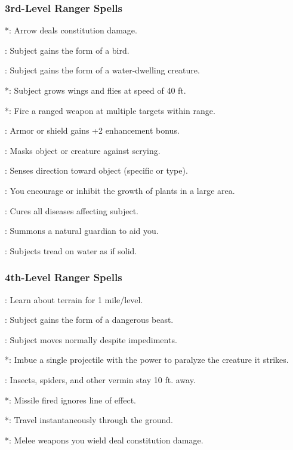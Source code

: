 \subsubsection{3rd-Level Ranger Spells}
\begin{list}{}{\leftmargin=1em}
\item {}*: Arrow deals constitution damage.
\item {}: Subject gains the form of a bird.
\item {}: Subject gains the form of a water-dwelling creature.
\item {}*: Subject grows wings and flies at speed of 40 ft.
\item {}*: Fire a ranged weapon at multiple targets within range.
\item {}: Armor or shield gains +2 enhancement bonus.
\item {}: Masks object or creature against scrying.
\item {}: Senses direction toward object (specific or type).
\item {}: You encourage or inhibit the growth of plants in a large area.
\item {}: Cures all diseases affecting subject.
\item {}: Summons a natural guardian to aid you.
\item {}: Subjects tread on water as if solid.
\end{list}
\subsubsection{4th-Level Ranger Spells}
\begin{list}{}{\leftmargin=1em}
\item {}: Learn about terrain for 1 mile/level.
\item {}: Subject gains the form of a dangerous beast.
\item {}: Subject moves normally despite impediments.
\item {}*: Imbue a single projectile with the power to paralyze the creature it strikes.
\item {}: Insects, spiders, and other vermin stay 10 ft. away.
\item {}*: Missile fired ignores line of effect.
\item {}*: Travel instantaneously through the ground.
\item {}*: Melee weapons you wield deal constitution damage.
\end{list}
